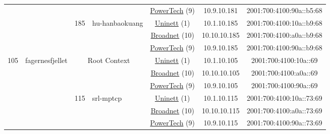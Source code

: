 \begin{small}
\begin{center}
\begin{longtable}{|c|c|c|c|c|c|c|c|}
  &  &  &  & \multicolumn{2}{|c|}{\tiny{\href{http://www.powertech.no}{PowerTech} (9)}} & \tiny{10.9.10.181} & \tiny{2001:700:4100:90a::b5:68} \\* \cline{3-3}\cline{4-4}\cline{5-5}\cline{6-6}\cline{7-7}\cline{8-8}
  &  & \multirow{3}{*}{\tiny{185}} & \multicolumn{1}{|l|}{\multirow{3}{*}{\tiny{hu-hanbaokuang}}} & \multicolumn{2}{|c|}{\tiny{\href{https://www.uninett.no}{Uninett} (1)}} & \tiny{10.1.10.185} & \tiny{2001:700:4100:10a::b9:68} \\* \cline{5-5}\cline{6-6}\cline{7-7}\cline{8-8}
  &  &  &  & \multicolumn{2}{|c|}{\tiny{\href{https://www.broadnet.no}{Broadnet} (10)}} & \tiny{10.10.10.185} & \tiny{2001:700:4100:a0a::b9:68} \\* \cline{5-5}\cline{6-6}\cline{7-7}\cline{8-8}
  &  &  &  & \multicolumn{2}{|c|}{\tiny{\href{http://www.powertech.no}{PowerTech} (9)}} & \tiny{10.9.10.185} & \tiny{2001:700:4100:90a::b9:68} \\ \hline
 \multirow{36}{*}{\tiny{105}} & \multicolumn{1}{|l|}{\multirow{36}{*}{\tiny{fagernesfjellet}}} & \multicolumn{2}{|c|}{\multirow{3}{*}{\tiny{Root Context}}} & \multicolumn{2}{|c|}{\tiny{\href{https://www.uninett.no}{Uninett} (1)}} & \tiny{10.1.10.105} & \tiny{2001:700:4100:10a::69} \\* \cline{5-5}\cline{6-6}\cline{7-7}\cline{8-8}
  &  & \multicolumn{2}{|c|}{} & \multicolumn{2}{|c|}{\tiny{\href{https://www.broadnet.no}{Broadnet} (10)}} & \tiny{10.10.10.105} & \tiny{2001:700:4100:a0a::69} \\* \cline{5-5}\cline{6-6}\cline{7-7}\cline{8-8}
  &  & \multicolumn{2}{|c|}{} & \multicolumn{2}{|c|}{\tiny{\href{http://www.powertech.no}{PowerTech} (9)}} & \tiny{10.9.10.105} & \tiny{2001:700:4100:90a::69} \\* \cline{3-3}\cline{4-4}\cline{5-5}\cline{6-6}\cline{7-7}\cline{8-8}
  &  & \multirow{3}{*}{\tiny{115}} & \multicolumn{1}{|l|}{\multirow{3}{*}{\tiny{srl-mptcp}}} & \multicolumn{2}{|c|}{\tiny{\href{https://www.uninett.no}{Uninett} (1)}} & \tiny{10.1.10.115} & \tiny{2001:700:4100:10a::73:69} \\* \cline{5-5}\cline{6-6}\cline{7-7}\cline{8-8}
  &  &  &  & \multicolumn{2}{|c|}{\tiny{\href{https://www.broadnet.no}{Broadnet} (10)}} & \tiny{10.10.10.115} & \tiny{2001:700:4100:a0a::73:69} \\* \cline{5-5}\cline{6-6}\cline{7-7}\cline{8-8}
  &  &  &  & \multicolumn{2}{|c|}{\tiny{\href{http://www.powertech.no}{PowerTech} (9)}} & \tiny{10.9.10.115} & \tiny{2001:700:4100:90a::73:69} \\* \cline{3-3}\cline{4-4}\cline{5-5}\cline{6-6}\cline{7-7}\cline{8-8}

\end{longtable}
\end{center}
\end{small}
